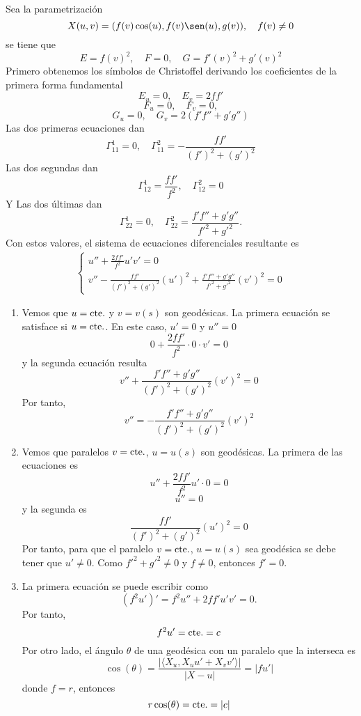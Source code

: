 \begin{ejm}
  Sea la parametrización 
  \[ 
    X(u,v) = (f(v) \cos(u), f(v) \sen(u), g(v)), \quad f(v) \neq 0
  \] 
  se tiene que
  \[ 
    E = f(v)^{2}, \quad F = 0, \quad G = f'(v)^{2} + g'(v)^{2}
  \] 
  Primero obtenemos los símbolos de Christoffel derivando los coeficientes de la primera forma fundamental
  \[ 
    E_{u} = 0, \quad E_{v} = 2 f f' 
  \] 
  \[ 
    F_{u} = 0, \quad F_{v} = 0, 
  \] 
  \[ 
    G_{u} = 0, \quad G_{v} = 2(f' f'' + g' g'') 
  \] 
  Las dos primeras ecuaciones dan
  \[ 
    \Gamma_{11}^{1} = 0, \quad \Gamma_{11}^{2} = - \frac{f f'}{(f')^{2} + (g')^{2}} 
  \] 
  Las dos segundas dan
  \[ 
    \Gamma_{12}^{1} = \frac{f f'}{f^{2}}, \quad \Gamma_{12}^{2} = 0
  \] 
  Y Las dos últimas dan
  \[ 
    \Gamma_{22}^{1} = 0, \quad \Gamma_{22}^{2} = \frac{f' f'' + g' g''}{f'^{2} + g'^{2}}.
  \] 
  Con estos valores, el sistema de ecuaciones diferenciales resultante es
  \[ 
    \begin{aligned}
      \begin{cases}
        u'' + \frac{2 f f'}{f^{2}}u' v' = 0 \\
        v'' - \frac{f f'}{(f')^{2} + (g')^{2}}(u')^{2} + \frac{f' f'' + g' g''}{f'^{2} + g'^{2}}(v')^{2} = 0
      \end{cases}
    \end{aligned} 
  \]   
  \begin{enumerate}[label=(\roman*)]
    \item   Vemos que $u = \operatorname{cte.}$ y $v = v(s)$ son geodésicas. La primera ecuación se satisface si $u = \operatorname{cte.}$. En este caso, $u' = 0$ y $u'' = 0$
  \[ 
    0 + \frac{2 f f'}{f^{2}} \cdot 0 \cdot v' = 0 
  \] 
  y la segunda ecuación resulta
  \[ 
    v'' + \frac{f' f'' + g' g''}{(f')^{2} + (g')^{2}} (v')^{2} = 0 
  \] 
  Por tanto,
  \[ 
    v'' = - \frac{f' f'' + g' g''}{(f')^{2} + (g')^{2}} (v')^{2}
  \] 
    \item Vemos que paralelos $v = \operatorname{cte.}$, $u = u(s)$ son geodésicas. La primera de las ecuaciones es
      \[ 
        u'' + \frac{2 f f'}{f^{2}}u' \cdot 0 = 0
      \] 
      \[ 
        u'' = 0 
      \] 
      y la segunda es
      \[ 
        \frac{f f'}{(f')^{2} + (g')^{2}}(u')^{2} = 0
      \] 
      Por tanto, para que el paralelo $v = \operatorname{cte.}$, $u = u(s)$ sea geodésica se debe tener que $u' \neq 0$. Como $f'^{2} + g'^{2} \neq 0$ y $ f \neq 0$, entonces $f' = 0$.
    \item La primera ecuación se puede escribir como 
      \[ 
        (f^{2} u')' = f^{2} u'' + 2 f f' u' v' = 0.
      \] 
      Por tanto, 
      \[ 
        f^{2} u' = \operatorname{cte.} = c 
      \] 
      Por otro lado, el ángulo $\theta$ de una geodésica con un paralelo que la interseca es 
      \[ 
        \cos(\theta) = \frac{| \langle X_{u}{ , }X_{u} u' + X_{v} v' \rangle |}{| X-u |} = | f u' | 
      \] 
      donde $f = r$, entonces
      \[  
        r \cos(\theta) = \operatorname{cte.} = | c |
      \] 

  \end{enumerate}
\end{ejm}

